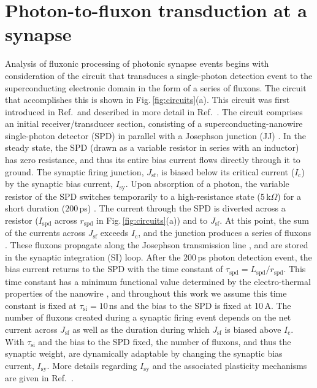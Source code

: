 \documentclass[twocolumn]{article}
\newcommand{\onlinecite}[1]{\hspace{-1 ex} \nocite{#1}\citenum{#1}}
\begin{document}
\section{\label{sec:synapse}Photon-to-fluxon transduction at a synapse}
Analysis of fluxonic processing of photonic synapse events begins with consideration of the circuit that transduces a single-photon detection event to the superconducting electronic domain in the form of a series of fluxons. The circuit that accomplishes this is shown in Fig.\,\ref{fig:circuits}(a). This circuit was first introduced in Ref.\,\onlinecite{sh2018} and described in more detail in Ref.\,\onlinecite{sh2018_full}. The circuit comprises an initial receiver/transducer section, consisting of a superconducting-nanowire single-photon detector (SPD) \cite{gook2001,nata2012,liyo2013,mave2013} in parallel with a Josephson junction (JJ) \cite{ti1996,vatu1998,ka1999}. In the steady state, the SPD (drawn as a variable resistor in series with an inductor) has zero resistance, and thus its entire bias current flows directly through it to ground. The synaptic firing junction, $J_{\mathrm{sf}}$, is biased below its critical current ($I_{\mathrm{c}}$) by the synaptic bias current, $I_{\mathrm{sy}}$. Upon absorption of a photon, the variable resistor of the SPD switches temporarily to a high-resistance state ($5$\,k$\Omega$) for a short duration ($200$\,ps) \cite{yake2007}. The current through the SPD is diverted across a resistor ($I_{\mathrm{spd}}$ across $r_{\mathrm{spd}}$ in Fig.\,\ref{fig:circuits}(a)) and to $J_{\mathrm{sf}}$. At this point, the sum of the currents across $J_{\mathrm{sf}}$ exceeds $I_{\mathrm{c}}$, and the junction produces a series of fluxons \cite{ti1996,vatu1998,ka1999}. These fluxons propagate along the Josephson transmission line \cite{vatu1998,ka1999}, and are stored in the synaptic integration (SI) loop. After the 200\,ps photon detection event, the bias current returns to the SPD with the time constant of $\tau_{\mathrm{spd}} = L_{\mathrm{spd}}/r_{\mathrm{spd}}$. This time constant has a minimum functional value determined by the electro-thermal properties of the nanowire \cite{yake2007}, and throughout this work we assume this time constant is fixed at $\tau_{\mathrm{si}} = 10$\,ns and the bias to the SPD is fixed at 10\,\textmu A. The number of fluxons created during a synaptic firing event depends on the net current across $J_{\mathrm{sf}}$ as well as the duration during which $J_{\mathrm{sf}}$ is biased above $I_{\mathrm{c}}$. With $\tau_{\mathrm{si}}$ and the bias to the SPD fixed, the number of fluxons, and thus the synaptic weight, are dynamically adaptable by changing the synaptic bias current, $I_{\mathrm{sy}}$. More details regarding $I_{\mathrm{sy}}$ and the associated plasticity mechanisms are given in Ref.\,\onlinecite{sh2018_full}.
 
\end{document}
